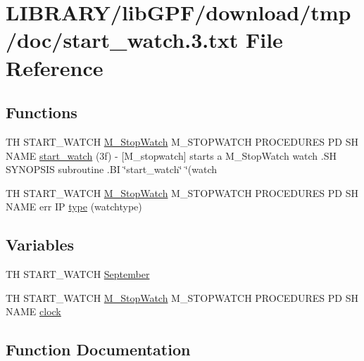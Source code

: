\hypertarget{start__watch_83_8txt}{}\section{L\+I\+B\+R\+A\+R\+Y/lib\+G\+P\+F/download/tmp/doc/start\+\_\+watch.3.txt File Reference}
\label{start__watch_83_8txt}
\subsection*{Functions}
\begin{DoxyCompactItemize}
\item 
TH S\+T\+A\+R\+T\+\_\+\+W\+A\+T\+CH \hyperlink{option__stopwatch_83_8txt_aa2011fc45a5e502e87ee50996a8a9305}{M\+\_\+\+Stop\+Watch} M\+\_\+\+S\+T\+O\+P\+W\+A\+T\+CH P\+R\+O\+C\+E\+D\+U\+R\+ES PD SH N\+A\+ME \hyperlink{start__watch_83_8txt_ab7768fefc46b7d8afde391ec2cdf93f8}{start\+\_\+watch} (3f) -\/ \mbox{[}\+M\+\_\+stopwatch\mbox{]} starts a M\+\_\+\+Stop\+Watch watch .\+S\+H S\+Y\+N\+O\+P\+S\+I\+S subroutine .\+B\+I \char`\"{}start\+\_\+watch\char`\"{} \char`\"{}(watch
\item 
TH S\+T\+A\+R\+T\+\_\+\+W\+A\+T\+CH \hyperlink{option__stopwatch_83_8txt_aa2011fc45a5e502e87ee50996a8a9305}{M\+\_\+\+Stop\+Watch} M\+\_\+\+S\+T\+O\+P\+W\+A\+T\+CH P\+R\+O\+C\+E\+D\+U\+R\+ES PD SH N\+A\+ME err IP \hyperlink{start__watch_83_8txt_afb126b5ee09c3784b94acaa05b3b2d5f}{type} (watchtype)
\end{DoxyCompactItemize}
\subsection*{Variables}
\begin{DoxyCompactItemize}
\item 
TH S\+T\+A\+R\+T\+\_\+\+W\+A\+T\+CH \hyperlink{start__watch_83_8txt_aa28beaa3f308bdbe703fa8484f87082d}{September}
\item 
TH S\+T\+A\+R\+T\+\_\+\+W\+A\+T\+CH \hyperlink{option__stopwatch_83_8txt_aa2011fc45a5e502e87ee50996a8a9305}{M\+\_\+\+Stop\+Watch} M\+\_\+\+S\+T\+O\+P\+W\+A\+T\+CH P\+R\+O\+C\+E\+D\+U\+R\+ES PD SH N\+A\+ME \hyperlink{start__watch_83_8txt_aeadc6e1a3f40066d313c6190ab99a7fe}{clock}
\end{DoxyCompactItemize}


\subsection{Function Documentation}
\mbox{\label{start__watch_83_8txt_ab7768fefc46b7d8afde391ec2cdf93f8}} 
